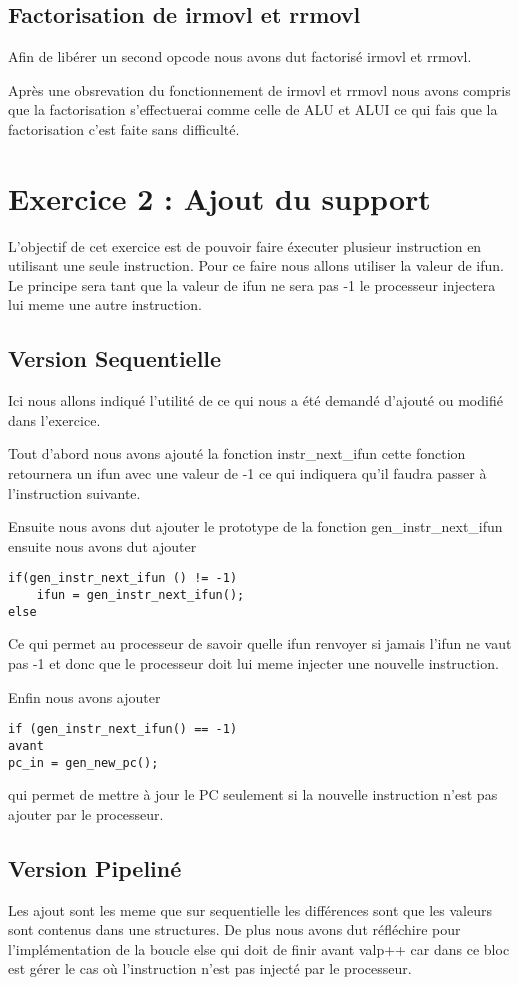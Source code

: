 \documentclass[12pt]{article}
\begin{document}
\subsection{Factorisation de irmovl et rrmovl}
Afin de libérer un second opcode nous avons dut factorisé irmovl et rrmovl.

Après une obsrevation du fonctionnement de irmovl et rrmovl nous avons compris que la factorisation s'effectuerai comme celle de ALU et ALUI ce qui fais que la factorisation c'est faite sans difficulté.

\newpage

\section{Exercice 2 : Ajout du support}

L'objectif de cet exercice est de pouvoir faire éxecuter plusieur instruction en utilisant une seule instruction. Pour ce faire nous allons utiliser la valeur de ifun. Le principe sera tant que la valeur de ifun ne sera pas -1 le processeur injectera lui meme une autre instruction.

\subsection{Version Sequentielle}
Ici nous allons indiqué l'utilité de ce qui nous a été demandé d'ajouté ou modifié dans l'exercice.

Tout d'abord nous avons  ajouté la fonction instr\_next\_ifun cette fonction retournera un ifun avec une valeur de -1 ce qui indiquera qu'il faudra passer à l'instruction suivante.

Ensuite nous avons dut ajouter le prototype de la fonction gen\_instr\_next\_ifun ensuite nous avons dut ajouter 
\begin{verbatim}
if(gen_instr_next_ifun () != -1)
	ifun = gen_instr_next_ifun();
else
\end{verbatim}
Ce qui permet au processeur de savoir quelle ifun renvoyer si jamais l'ifun ne vaut pas -1 et donc que le processeur doit lui meme injecter une nouvelle instruction.

Enfin nous avons ajouter 
\begin{verbatim}
if (gen_instr_next_ifun() == -1)
avant
pc_in = gen_new_pc();
\end{verbatim}
qui permet de mettre à jour le PC seulement si la nouvelle instruction n'est pas ajouter par le processeur.

\subsection{Version Pipeliné}
Les ajout sont les meme que sur sequentielle les différences sont que les valeurs sont contenus dans une structures. De plus nous avons dut réfléchire pour l'implémentation de la boucle else qui doit de finir avant valp++ car dans ce bloc est gérer le cas où l'instruction n'est pas injecté par le processeur.
\newpage
\end{document}
